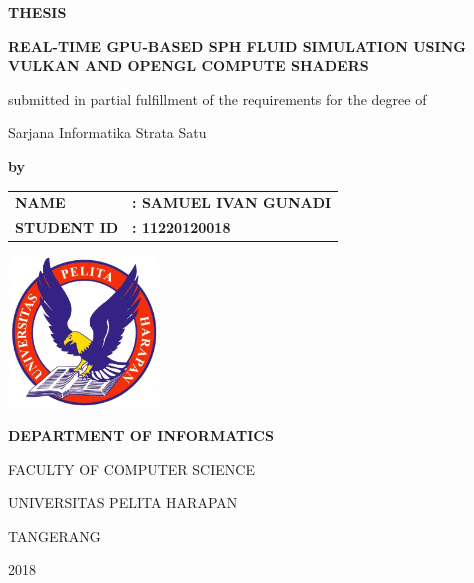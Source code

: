 \documentclass[a4paper, 12pt, oneside]{book}
\begin{document}
\frontmatter

 
\thispagestyle{empty}

\begin{center}
    \begin{doublespace}
        
        \textbf{\MakeTextUppercase{Thesis}}
        
        \bigskip
        
        {\bfseries\large\MakeTextUppercase{Real-Time GPU-Based SPH Fluid Simulation Using Vulkan and OpenGL Compute Shaders}}
        
        \bigskip
        \small{submitted in partial fulfillment of the requirements for the degree of\par Sarjana Informatika Strata Satu}
        
        \vspace{1.5cm}
        
        \textbf{by}
        
        \begin{tabular}{>{\bfseries}l >{\bfseries}l}
            \MakeTextUppercase{Name} & \MakeTextUppercase{: Samuel Ivan Gunadi} \\
            \MakeTextUppercase{Student ID} & \MakeTextUppercase{: 11220120018}
        \end{tabular}
        
        \vspace{3cm}
        
    \end{doublespace}
    \includegraphics[height=4cm, width=4cm]{images/uph_logo.png}
    \vspace{3.5cm}
    \begin{singlespace}
        \bfseries
        \MakeTextUppercase{Department of Informatics}
        
        \MakeTextUppercase{Faculty of Computer Science}
        
        \MakeTextUppercase{Universitas Pelita Harapan}
        
        \MakeTextUppercase{Tangerang}
        
        \MakeTextUppercase{2018}
    \end{singlespace}
\end{center}
\end{document}
